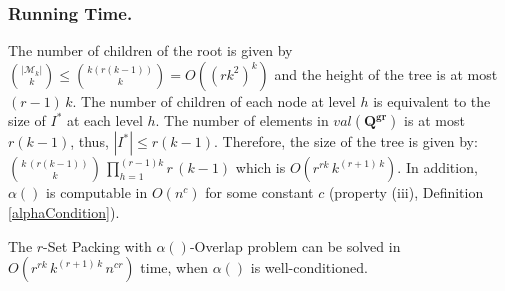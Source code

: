 \subsubsection{Running Time.}
The number of children of the root is given by  $\binom{|\mathcal{M}_k|}{k} \leq \binom{k(r(k-1))}{k} = O((rk^2)^k)$ and the height of the tree is at most $(r-1)\,k$.  The number of children of each node at level $h$ is equivalent to the size of $I^*$ at each level $h$. The number of elements in $val(\mathbf{Q^{gr}})$ is at most $r(k-1)$, thus, $|I^*| \leq r(k-1)$. Therefore, the size of the tree is given by: $\binom{k\,(r(k-1))}{k} \, \prod_{h=1}^{(r-1)k} r\,(k-1)$ which is $O(r^{rk}\, k^{(r+1)\, k})$. In addition, $\alpha()$  is computable in $O(n^c)$ for some constant $c$ (property (iii), Definition \ref{alphaCondition}).

\begin{theorem}\label{runningtime}
The $r$-Set Packing with $\alpha()$-Overlap problem can be solved in \\ $O(r^{rk}\, k^{(r+1)\,k}\, n^{cr})$ time, when $\alpha()$ is well-conditioned.
\end{theorem}